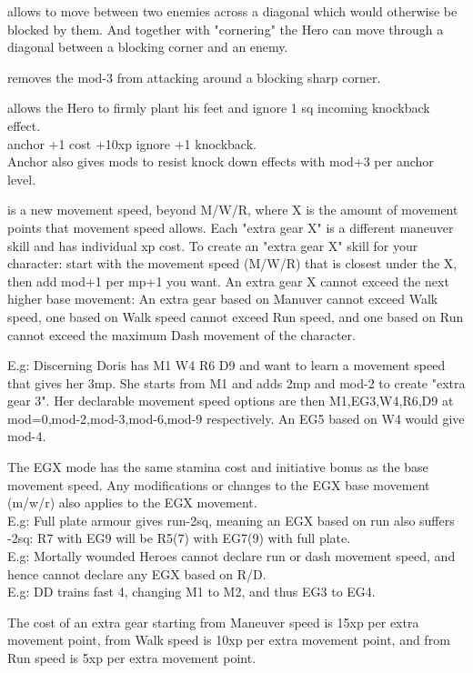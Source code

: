  allows to move between two enemies across a diagonal which would otherwise be blocked by them. And together with "cornering" the Hero can move through a diagonal between a blocking corner and an enemy.


 removes the mod-3 from attacking around a blocking sharp corner.


 allows the Hero to firmly plant his feet and ignore 1 sq incoming knockback effect.\\
anchor +1 cost +10xp ignore +1 knockback.\\
Anchor also gives mods to resist knock down effects with mod+3 per anchor level.


 is a new movement speed, beyond M/W/R, where X is the amount of movement points that movement speed allows. Each "extra gear X" is a different maneuver skill and has individual xp cost. To create an "extra gear X" skill for your character: start with the movement speed (M/W/R) that is closest under the X, then add mod+1 per mp+1 you want. An extra gear X cannot exceed the next higher base movement: An extra gear based on Manuver cannot exceed Walk speed, one based on Walk speed cannot exceed Run speed, and one based on Run cannot exceed the maximum Dash movement of the character.

E.g: Discerning Doris has M1 W4 R6 D9 and want to learn a movement speed that gives her 3mp. She starts from M1 and adds 2mp and mod-2 to create "extra gear 3". Her declarable movement speed options are then M1,EG3,W4,R6,D9 at mod=0,mod-2,mod-3,mod-6,mod-9 respectively. An EG5 based on W4 would give mod-4.

The EGX mode has the same stamina cost and initiative bonus as the base movement speed. Any modifications or changes to the EGX base movement (m/w/r) also applies to the EGX movement. \\
E.g: Full plate armour gives run-2sq, meaning an EGX based on run also suffers -2sq: R7 with EG9 will be R5(7) with EG7(9) with full plate. \\
E.g: Mortally wounded Heroes cannot declare run or dash movement speed, and hence cannot declare any EGX based on R/D.\\
E.g: DD trains fast 4, changing M1 to M2, and thus EG3 to EG4.

The cost of an extra gear starting from Maneuver speed is 15xp per extra movement point, from Walk speed is 10xp per extra movement point, and from Run speed is 5xp per extra movement point.

